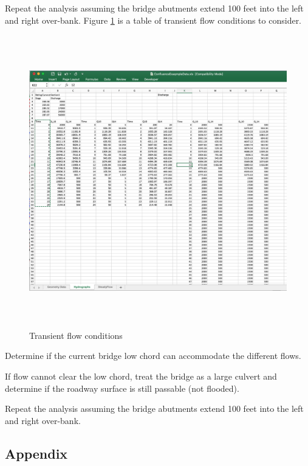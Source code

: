 Repeat the analysis assuming the bridge abutments extend 100 feet into the left and right over-bank.
\clearpage
Figure \ref{fig:hydrographs-table} is a table of transient flow conditions to consider. 
\begin{figure}[h!] %
   \centering
   \includegraphics[height=5in]{hydrographs-table.png} 
   \caption{Transient flow conditions }
   \label{fig:hydrographs-table}
\end{figure}
\newline
Determine if the current bridge low chord can accommodate the different flows.  


If flow cannot clear the low chord, treat the bridge as a large culvert and determine if the roadway surface is still passable (not flooded).

Repeat the analysis assuming the bridge abutments extend 100 feet into the left and right over-bank.






\subsection{Appendix}
